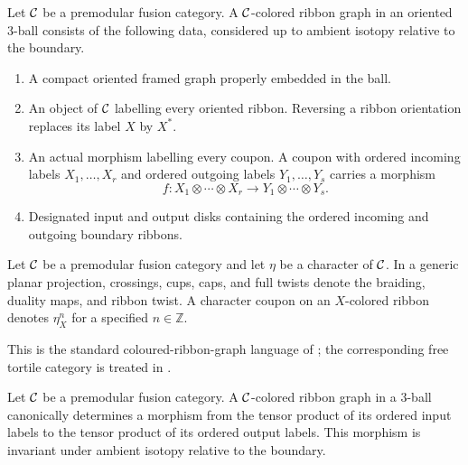 \begin{definition}
\label{def:colored-ribbon-graph}
Let \(\mathcal{C}\) be a premodular fusion category.  A $\mathcal{C}$-colored ribbon graph
in an oriented $3$-ball consists of the
following data, considered up to ambient isotopy relative to the boundary.
\begin{enumerate}[label=(\roman*),ref=\roman*]
  \item\label{item:ribbon-embedding}
  A compact oriented framed graph properly embedded in the ball.

  \item\label{item:ribbon-labels}
  An object of $\mathcal{C}$ labelling every oriented ribbon.  Reversing a ribbon
  orientation replaces its label $X$ by $X^*$.

  \item\label{item:ribbon-coupons}
  An actual morphism labelling every coupon.  A coupon with ordered incoming
  labels $X_1,\ldots,X_r$ and ordered outgoing labels
  $Y_1,\ldots,Y_s$ carries a morphism
  \[
    f\colon X_1\otimes\cdots\otimes X_r
    \longrightarrow Y_1\otimes\cdots\otimes Y_s.
  \]

  \item\label{item:ribbon-boundary}
  Designated input and output disks containing the ordered incoming and
  outgoing boundary ribbons.
\end{enumerate}
\end{definition}

\begin{convention}
\label{conv:graphical-generators}
Let \(\mathcal{C}\) be a premodular fusion category and let \(\eta\) be a character
of \(\mathcal{C}\).  In a generic planar projection,
crossings, cups, caps, and full twists denote the braiding, duality maps, and
ribbon twist.  A character coupon on an $X$-colored ribbon denotes
$\eta_X^n$ for a specified $n\in\mathbb Z$.
\end{convention}

\begin{remark}
\label{rem:ribbon-graph-references}
This is the standard coloured-ribbon-graph language of
\cite[Chapter~2, Sections~2.2--2.3]{BakalovKirillov2001}; the corresponding
free tortile category is treated in \cite[Theorem~6.1]{Shum1994}.
\end{remark}

\begin{proposition}
\label{prop:graphical-interpretation}
Let \(\mathcal{C}\) be a premodular fusion category.  A $\mathcal{C}$-colored ribbon graph
in a $3$-ball canonically determines a morphism
from the tensor product of its ordered input labels to the tensor product of
its ordered output labels.  This morphism is invariant under ambient isotopy
relative to the boundary.
\end{proposition}


